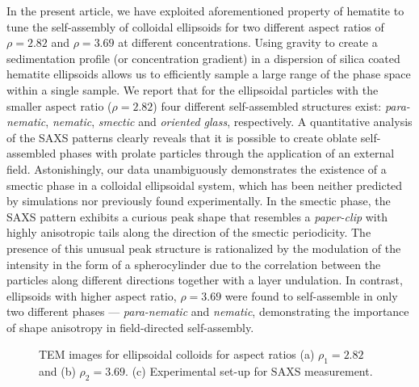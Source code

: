 \documentclass[aps,prl,preprint,superscriptaddress]{revtex4-1} %
\begin{document}
In the present article, we have exploited aforementioned property of hematite to tune the self-assembly of colloidal ellipsoids for two different aspect ratios of $\rho = 2.82$ and $\rho = 3.69$ at different concentrations. Using gravity to create a sedimentation profile (or concentration gradient) in a dispersion of silica coated hematite ellipsoids allows us to efficiently sample a large range of the phase space within a single sample. We report that for the ellipsoidal particles with the smaller aspect ratio ($\rho=2.82$) four different self-assembled structures exist: \emph{para-nematic}, \emph{nematic}, \emph{smectic} and \emph{oriented glass}, respectively. A quantitative analysis of the SAXS patterns clearly reveals that it is possible to create oblate self-assembled phases with prolate particles through the application of an external field. Astonishingly, our data unambiguously demonstrates the existence of a smectic phase in a colloidal ellipsoidal system, which has been neither predicted by simulations nor previously found experimentally. In the smectic phase, the SAXS pattern exhibits a curious peak shape that resembles a \textit{paper-clip} with highly anisotropic tails along the direction of the smectic periodicity. The presence of this unusual peak structure is rationalized by the modulation of the intensity in the form of a spherocylinder due to the correlation between the particles along different directions together with a layer undulation. In contrast, ellipsoids with higher aspect ratio, $\rho=3.69$ were found to self-assemble in only two different phases --- \emph{para-nematic} and \emph{nematic}, demonstrating the importance of shape anisotropy in field-directed self-assembly.
\begin{figure}[!h]
\caption{TEM images for ellipsoidal colloids for aspect ratios (a) $\rho_1=2.82$ and (b) $\rho_2=3.69$. (c) Experimental set-up for SAXS measurement.}\label{TEM}
\end{figure}
\end{document}
